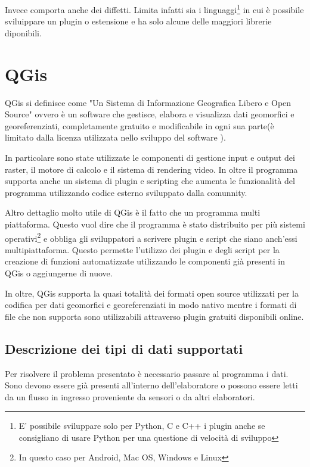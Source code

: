 Invece comporta anche dei diffetti. Limita infatti sia i linguaggi\footnote{E' possibile sviluppare solo per Python, C e C++ i plugin anche se consigliano di usare Python per una questione di velocità di sviluppo} in cui è possibile sviluippare un plugin o estensione e ha solo alcune delle maggiori librerie diponibili.

\section{QGis}

QGis si definisce come "Un Sistema di Informazione Geografica Libero e Open Source"\cite{site:qgis} ovvero è un software che gestisce, elabora e visualizza dati geomorfici e georeferenziati, completamente gratuito e modificabile in ogni sua parte(è limitato dalla licenza utilizzata nello sviluppo del software \cite{site:cc3}).

In particolare sono state utilizzate le componenti di gestione input e output dei raster, il motore di calcolo e il sistema di rendering video. In oltre il programma supporta anche un sistema di plugin e scripting che aumenta le funzionalità del programma utilizzando codice esterno sviluppato dalla comunnity.

Altro dettaglio molto utile di QGis è il fatto che un programma multi piattaforma. Questo vuol dire che il programma è stato distribuito per più sistemi operativi\footnote{In questo caso per Android, Mac OS, Windows e Linux} e obbliga gli sviluppatori a scrivere plugin e script che siano anch'essi multipiattaforma. Questo permette l'utilizzo dei plugin e degli script per la creazione di funzioni automatizzate utilizzando le componenti già presenti in QGis o aggiungerne di nuove.

In oltre, QGis supporta la quasi totalità dei formati open source utilizzati per la codifica per dati geomorfici e georeferenziati in modo nativo mentre i formati di file che non supporta sono utilizzabili attraverso plugin gratuiti disponibili online.

\subsection{Descrizione dei tipi di dati supportati}

Per risolvere il problema presentato è necessario passare al programma i dati. Sono devono essere già presenti all'interno dell'elaboratore o possono essere letti da un flusso in ingresso proveniente da sensori o da altri elaboratori.

